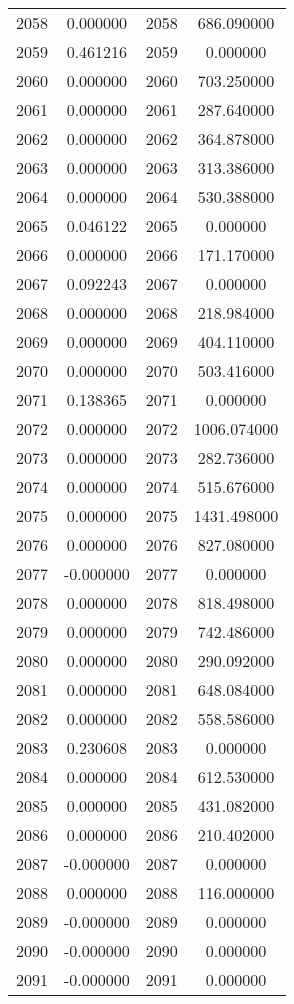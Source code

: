 \documentclass[12pt]{article}
\begin{document}
\begin{longtable}{@{}cccc@{}}
2058 & 0.000000 & 2058 & 686.090000 \\
2059 & 0.461216 & 2059 & 0.000000 \\
2060 & 0.000000 & 2060 & 703.250000 \\
2061 & 0.000000 & 2061 & 287.640000 \\
2062 & 0.000000 & 2062 & 364.878000 \\
2063 & 0.000000 & 2063 & 313.386000 \\
2064 & 0.000000 & 2064 & 530.388000 \\
2065 & 0.046122 & 2065 & 0.000000 \\
2066 & 0.000000 & 2066 & 171.170000 \\
2067 & 0.092243 & 2067 & 0.000000 \\
2068 & 0.000000 & 2068 & 218.984000 \\
2069 & 0.000000 & 2069 & 404.110000 \\
2070 & 0.000000 & 2070 & 503.416000 \\
2071 & 0.138365 & 2071 & 0.000000 \\
2072 & 0.000000 & 2072 & 1006.074000 \\
2073 & 0.000000 & 2073 & 282.736000 \\
2074 & 0.000000 & 2074 & 515.676000 \\
2075 & 0.000000 & 2075 & 1431.498000 \\
2076 & 0.000000 & 2076 & 827.080000 \\
2077 & -0.000000 & 2077 & 0.000000 \\
2078 & 0.000000 & 2078 & 818.498000 \\
2079 & 0.000000 & 2079 & 742.486000 \\
2080 & 0.000000 & 2080 & 290.092000 \\
2081 & 0.000000 & 2081 & 648.084000 \\
2082 & 0.000000 & 2082 & 558.586000 \\
2083 & 0.230608 & 2083 & 0.000000 \\
2084 & 0.000000 & 2084 & 612.530000 \\
2085 & 0.000000 & 2085 & 431.082000 \\
2086 & 0.000000 & 2086 & 210.402000 \\
2087 & -0.000000 & 2087 & 0.000000 \\
2088 & 0.000000 & 2088 & 116.000000 \\
2089 & -0.000000 & 2089 & 0.000000 \\
2090 & -0.000000 & 2090 & 0.000000 \\
2091 & -0.000000 & 2091 & 0.000000 \\

\end{longtable}
\end{document}
